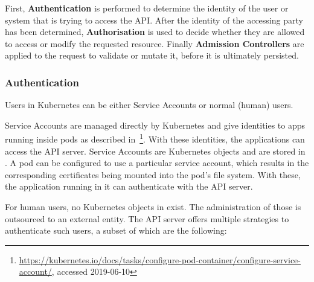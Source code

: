 First, \textbf{Authentication} is performed to determine the identity of the user or system that is trying to access the API. After the identity of the accessing party has been determined, \textbf{Authorisation} is used to decide whether they are allowed to access or modify the requested resource. Finally \textbf{Admission Controllers} are applied to the request to validate or mutate it, before it is ultimately persisted.

\subsubsection{Authentication} \label{authentication}

Users in Kubernetes can be either Service Accounts or normal (human) users. 

Service Accounts are managed directly by Kubernetes and give identities to apps running inside pods as described in~\textcite{k8sdocs}\footnote{\url{https://kubernetes.io/docs/tasks/configure-pod-container/configure-service-account/}, accessed 2019-06-10}. With these identities, the applications can access the API server. Service Accounts are Kubernetes objects and are stored in . A pod can be configured to use a particular service account, which results in the corresponding certificates being mounted into the pod's file system. With these, the application running in it can authenticate with the API server. 

For human users, no Kubernetes objects in  exist. The administration of those is outsourced to an external entity. The API server offers multiple strategies to authenticate such users, a subset of which are the following:

